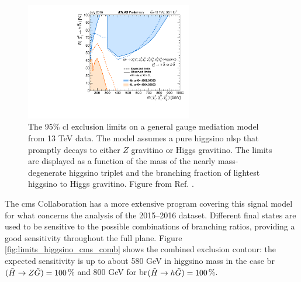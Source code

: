 \begin{figure}[htbp]
	\centering
	\includegraphics[width=0.65\textwidth]{figures/summary_plots/ATLAS_SUSY_EWSummary_GGM.pdf}
	\caption{The 95\% \gls{cl} exclusion limits on a general gauge mediation model from 13 TeV data. 
	The model assumes a pure higgsino \gls{nlsp} that promptly decays to either $Z$ gravitino or Higgs gravitino. 
	The limits are displayed as a function of the mass of the nearly mass-degenerate higgsino triplet and the branching fraction of lightest higgsino to Higgs gravitino. 	Figure from Ref. \cite{atlasSUSYSummary}.
	} 
	\label{fig:summary_atlas_higgsino_GMSB}
\end{figure}

The \gls{cms} Collaboration has a more extensive program covering this signal model for what concerns the analysis of the 
2015--2016 dataset. 
Different final states are used to be sensitive to the possible combinations of branching ratios, 
providing a good sensitivity throughout the full plane.
Figure \ref{fig:limits_higgsino_cms_comb} shows the combined exclusion contour: the expected sensitivity is up to about 580 GeV 
in higgsino mass in the case \gls{br}$(\tilde{H}\rightarrow Z \tilde{G})=100$\% and 800 GeV for 
\gls{br}$(\tilde{H}\rightarrow h \tilde{G})=100$\%.

